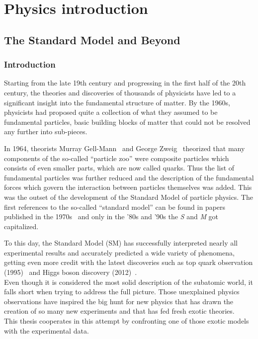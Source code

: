 \part{Physics introduction}
\chapter{The Standard Model and Beyond} \label{Chapter1} 

\section{Introduction}
Starting from the late 19th century and progressing in the first half of the 20th century, 
the theories and discoveries of thousands of physicists have led to a significant insight into the fundamental structure of matter. 
By the 1960s, physicists had proposed quite a collection of what they assumed to be fundamental particles, basic building blocks of matter that could not be resolved any further into sub-pieces. 

In 1964, theorists Murray Gell-Mann~\cite{GELLMANN1964214} and George Zweig~\cite{Zweig:570209} theorized that many components of the so-called ``particle zoo'' were composite particles which consists of even smaller parts, which are now called quarks. Thus the list of fundamental particles was further reduced and the description of the fundamental forces which govern the interaction between particles themselves was added. This was the outset of the development of the Standard Model of particle physics.
The first references to the so-called “standard model” can be found in papers published in the 1970s~\cite{Pais:1975gn,PhysRevD.13.680} and only in the '80s and '90s the \emph{S} and \emph{M} got capitalized.

To this day, the Standard Model (SM) has successfully interpreted nearly all experimental results and accurately predicted a wide variety of phenomena, getting even more credit with the latest discoveries such as top quark observation (1995)~\cite{Abachi_1995} and Higgs boson discovery (2012)~\cite{20121,201230}.\\
Even though it is considered the most solid description of the subatomic world, it falls short when trying to address the full picture. Those unexplained physics observations have inspired the big hunt for new physics that has drawn the creation of so many new experiments and that has fed fresh exotic theories. \\
This thesis cooperates in this attempt by confronting one of those exotic models with the experimental data. 


